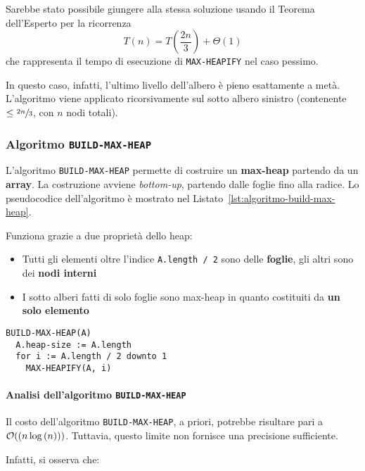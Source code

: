\documentclass[italian, 10pt]{article}
\begin{document}
\bigskip
Sarebbe stato possibile giungere alla stessa soluzione usando il Teorema dell'Esperto per la ricorrenza
\[ T(n) = T\left(\dfrac{2n}{3}\right) + \Theta(1) \]
che rappresenta il tempo di esecuzione di \texttt{MAX-HEAPIFY} nel caso pessimo.

In questo caso, infatti, l'ultimo livello dell'albero è pieno esattamente a metà.
L'algoritmo viene applicato ricorsivamente sul sotto albero sinistro (contenente \(\leq \sfrac{2n}{3}\), con \(n\) nodi totali).

\subsubsection{Algoritmo \texttt{BUILD-MAX-HEAP}}
\label{sec:algoritmo-build-max-heap}

L'algoritmo \texttt{BUILD-MAX-HEAP} permette di costruire un \textbf{max-heap} partendo da un \textbf{array}.
La costruzione avviene \textit{bottom-up}, partendo dalle foglie fino alla radice.
Lo pseudocodice dell'algoritmo è mostrato nel Listato~\ref{lst:algoritmo-build-max-heap}.

Funziona grazie a due proprietà dello heap:

\begin{itemize}
  \item Tutti gli elementi oltre l'indice \texttt{A.length / 2} sono delle \textbf{foglie}, gli altri sono dei \textbf{nodi interni}
  \item I sotto alberi fatti di solo foglie sono max-heap in quanto costituiti da \textbf{un solo elemento}
\end{itemize}

\begin{lstlisting}[float, style=pseudocode, caption={Algoritmo \texttt{BUILD-MAX-HEAP}}, label={lst:algoritmo-build-max-heap}]
BUILD-MAX-HEAP(A)
  A.heap-size := A.length
  for i := A.length / 2 downto 1
    MAX-HEAPIFY(A, i)
\end{lstlisting}

\paragraph{Analisi dell'algoritmo \texttt{BUILD-MAX-HEAP}}

Il costo dell'algoritmo \texttt{BUILD-MAX-HEAP}, a priori, potrebbe risultare pari a \(\mathcal{O}(\left(n \log{(n)}\right))\).
Tuttavia, questo limite non fornisce una precisione sufficiente.

Infatti, si osserva che:
\end{document}
